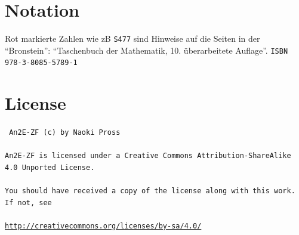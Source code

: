 \documentclass[a4paper]{article}
\numberwithin{equation}{subsection}
\newcommand{\brpage}[1]{\textcolor{red!70!black}{\small\texttt{S#1}}}
\begin{document}
\begin{multicols}{2}
\begin{thebibliography}{1}
\end{thebibliography}

\section*{Notation}
Rot markierte Zahlen wie zB \brpage{477} sind Hinweise auf die Seiten in der ``Bronstein'': ``Taschenbuch der Mathematik, 10. \"uberarbeitete Auflage''. \texttt{ISBN 978-3-8085-5789-1}

\section*{License}
{ \tt
An2E-ZF (c) by Naoki Pross
\\\\
An2E-ZF is licensed under a Creative Commons Attribution-ShareAlike 4.0 Unported License.
\\\\
You should have received a copy of the license along with this work. If not, see 
\\\\
\url{http://creativecommons.org/licenses/by-sa/4.0/}
}

\end{multicols}
\end{document}
